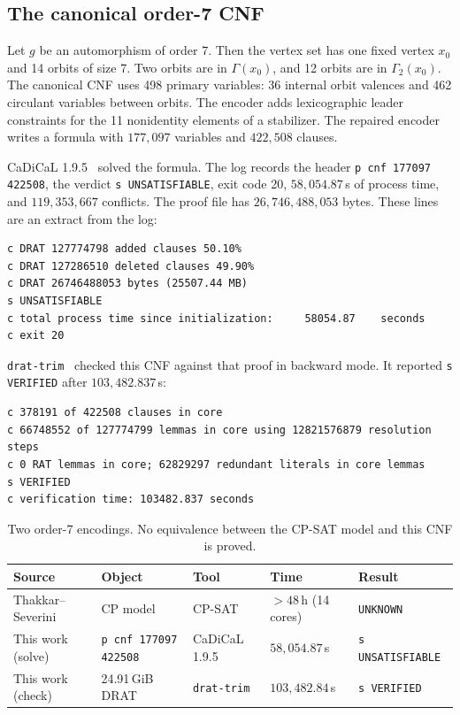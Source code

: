 \documentclass{article}
\theoremstyle{plain}
\theoremstyle{definition}
\numberwithin{equation}{section}
\begin{document}
\subsection{The canonical order-7 CNF}
\label{sec:order7}

Let $g$ be an automorphism of order 7. Then the vertex set has one fixed vertex $x_0$ and 14 orbits of size 7. Two orbits are in $\Gamma(x_0)$, and 12 orbits are in $\Gamma_2(x_0)$. The canonical CNF uses 498 primary variables: 36 internal orbit valences and 462 circulant variables between orbits. The encoder adds lexicographic leader constraints for the 11 nonidentity elements of a stabilizer. The repaired encoder writes a formula with $177{,}097$ variables and $422{,}508$ clauses.

CaDiCaL 1.9.5~\cite{biere2019cadical} solved the formula. The log records the header \texttt{p cnf 177097 422508}, the verdict \texttt{s UNSATISFIABLE}, exit code 20, $58{,}054.87$\,s of process time, and $119{,}353{,}667$ conflicts. The proof file has $26{,}746{,}488{,}053$ bytes. These lines are an extract from the log:
\begin{lstlisting}
c DRAT 127774798 added clauses 50.10%
c DRAT 127286510 deleted clauses 49.90%
c DRAT 26746488053 bytes (25507.44 MB)
s UNSATISFIABLE
c total process time since initialization:     58054.87    seconds
c exit 20
\end{lstlisting}
\texttt{drat-trim}~\cite{heule2013verifying} checked this CNF against that proof in backward mode. It reported \texttt{s VERIFIED} after $103{,}482.837$\,s:
\begin{lstlisting}
c 378191 of 422508 clauses in core
c 66748552 of 127774799 lemmas in core using 12821576879 resolution steps
c 0 RAT lemmas in core; 62829297 redundant literals in core lemmas
s VERIFIED
c verification time: 103482.837 seconds
\end{lstlisting}

\begin{table}[ht]
\centering
\footnotesize
\setlength{\tabcolsep}{3.5pt}
\caption{Two order-7 encodings. No equivalence between the CP-SAT model and this CNF is proved.}
\label{tab:order7_benchmark}
\begin{tabular}{@{}lllll@{}}
\toprule
Source & Object & Tool & Time & Result \\
\midrule
Thakkar--Severini~\cite{thakkar2026forced} & CP model & CP-SAT & $>48$\,h (14 cores) & \texttt{UNKNOWN} \\
This work (solve) & \texttt{p cnf 177097 422508} & CaDiCaL 1.9.5 & $58{,}054.87$\,s & \texttt{s UNSATISFIABLE} \\
This work (check) & 24.91\,GiB DRAT & \texttt{drat-trim} & $103{,}482.84$\,s & \texttt{s VERIFIED} \\
\bottomrule
\end{tabular}
\end{table}
\end{document}

